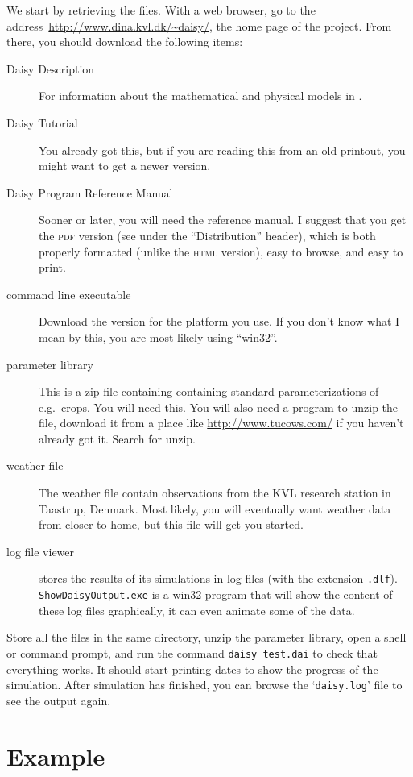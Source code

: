 \documentclass[a4paper,11pt]{article}
\begin{document}
We start by retrieving the files.  With a web browser, go to the
address~\url{http://www.dina.kvl.dk/~daisy/}, the home page of the
\daisy{} project.  From there, you should download the following
items:
\begin{description}
\item[Daisy Description] For information about the mathematical and
  physical models in \daisy{}.
\item[Daisy Tutorial] You already got this, but if you are reading
  this from an old printout, you might want to get a newer version.
\item[Daisy Program Reference Manual] Sooner or later, you will need
  the reference manual.  I suggest that you get the \textsc{pdf}
  version (see under the ``Distribution'' header), which is both
  properly formatted (unlike the \textsc{html} version), easy to
  browse, and easy to print.
\item[command line executable] Download the version for the platform
  you use.  If you don't know what I mean by this, you are most likely
  using ``win32''.
\item[parameter library] This is a zip file containing containing
  standard parameterizations of e.g.\ crops.  You will need this.  You
  will also need a program to unzip the file, download it from a place
  like \url{http://www.tucows.com/} if you haven't already got it.
  Search for unzip.
\item[weather file] The weather file contain observations from the KVL
  research station in Taastrup, Denmark.  Most likely, you will
  eventually want weather data from closer to home, but this file will
  get you started.
\item[log file viewer] \Daisy{} stores the results of its simulations
  in log files (with the extension \texttt{.dlf}).
  \texttt{ShowDaisyOutput.exe} is a win32 program that will show the
  content of these log files graphically, it can even animate some of
  the data.
\end{description}

Store all the files in the same directory, unzip the parameter
library, open a shell or command prompt, and run the command
\texttt{daisy test.dai} to check that everything works.  It should
start printing dates to show the progress of the simulation.  After
simulation has finished, you can browse the `\texttt{daisy.log}' file
to see the output again.

\section{Example}
\end{document}
